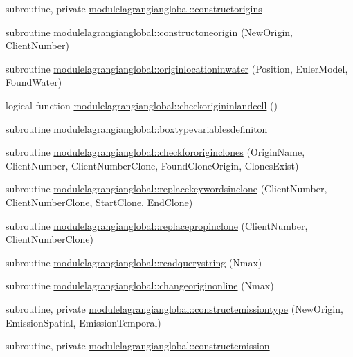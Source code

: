 \begin{DoxyCompactItemize}
\item 
subroutine, private \mbox{\hyperlink{namespacemodulelagrangianglobal_a18659553d3e4f0917dd7bc0bcdb6d109}{modulelagrangianglobal\+::constructorigins}}
\item 
subroutine \mbox{\hyperlink{namespacemodulelagrangianglobal_a13e19af68aa547fbcd1d97158976b7ef}{modulelagrangianglobal\+::constructoneorigin}} (New\+Origin, Client\+Number)
\item 
subroutine \mbox{\hyperlink{namespacemodulelagrangianglobal_a30ffc99c4d1df3eba66898b8f54fd8e8}{modulelagrangianglobal\+::originlocationinwater}} (Position, Euler\+Model, Found\+Water)
\item 
logical function \mbox{\hyperlink{namespacemodulelagrangianglobal_a356193ac68adebe4d96ff99a2bb2ba2d}{modulelagrangianglobal\+::checkorigininlandcell}} ()
\item 
subroutine \mbox{\hyperlink{namespacemodulelagrangianglobal_af59eca67cb4a5c0dd0d805d6a08538ba}{modulelagrangianglobal\+::boxtypevariablesdefiniton}}
\item 
subroutine \mbox{\hyperlink{namespacemodulelagrangianglobal_a3ffd33996e7947926b76916d8e614ab8}{modulelagrangianglobal\+::checkfororiginclones}} (Origin\+Name, Client\+Number, Client\+Number\+Clone, Found\+Clone\+Origin, Clones\+Exist)
\item 
subroutine \mbox{\hyperlink{namespacemodulelagrangianglobal_a9d7ee93eda9bae199e15651c725e4c7c}{modulelagrangianglobal\+::replacekeywordsinclone}} (Client\+Number, Client\+Number\+Clone, Start\+Clone, End\+Clone)
\item 
subroutine \mbox{\hyperlink{namespacemodulelagrangianglobal_a203dd84eb4a1c9f6704c8a3af740be1b}{modulelagrangianglobal\+::replacepropinclone}} (Client\+Number, Client\+Number\+Clone)
\item 
subroutine \mbox{\hyperlink{namespacemodulelagrangianglobal_abfdcea7a4323d6b93cc8c43b343ec0b3}{modulelagrangianglobal\+::readquerystring}} (Nmax)
\item 
subroutine \mbox{\hyperlink{namespacemodulelagrangianglobal_ac5eba799ef6e5891159d027cee26909c}{modulelagrangianglobal\+::changeoriginonline}} (Nmax)
\item 
subroutine, private \mbox{\hyperlink{namespacemodulelagrangianglobal_a33d8b80b431bb224984d6f64b001cd6a}{modulelagrangianglobal\+::constructemissiontype}} (New\+Origin, Emission\+Spatial, Emission\+Temporal)
\item 
subroutine, private \mbox{\hyperlink{namespacemodulelagrangianglobal_a19776a2b14eca267eac2af7e53ce5c77}{modulelagrangianglobal\+::constructemission}}

\end{DoxyCompactItemize}
